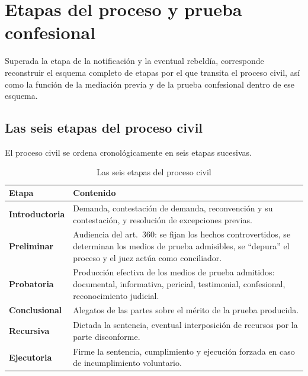 \documentclass[12pt,oneside]{book}
\begin{document}
\chapter[Etapas del proceso y prueba confesional]{Etapas del proceso y prueba confesional}
\label{ch:etapas}

Superada la etapa de la notificación y la eventual rebeldía, corresponde reconstruir el esquema completo de etapas por el que transita el proceso civil, así como la función de la mediación previa y de la prueba confesional dentro de ese esquema.

\section{Las seis etapas del proceso civil}

El proceso civil se ordena cronológicamente en seis etapas sucesivas.

\begin{table}[H]
\centering
\begin{tabularx}{\textwidth}{
    >{\raggedright\arraybackslash}p{}
    >{\raggedright\arraybackslash}X
}
\toprule
\textbf{Etapa} & \textbf{Contenido} \\
\midrule
\textbf{Introductoria} & Demanda, contestación de demanda, reconvención y su contestación, y resolución de excepciones previas. \\
\textbf{Preliminar} & Audiencia del art.\ 360: se fijan los hechos controvertidos, se determinan los medios de prueba admisibles, se ``depura'' el proceso y el juez actúa como conciliador. \\
\textbf{Probatoria} & Producción efectiva de los medios de prueba admitidos: documental, informativa, pericial, testimonial, confesional, reconocimiento judicial. \\
\textbf{Conclusional} & Alegatos de las partes sobre el mérito de la prueba producida. \\
\textbf{Recursiva} & Dictada la sentencia, eventual interposición de recursos por la parte disconforme. \\
\textbf{Ejecutoria} & Firme la sentencia, cumplimiento y ejecución forzada en caso de incumplimiento voluntario. \\
\bottomrule
\end{tabularx}
\caption{Las seis etapas del proceso civil}
\end{table}
\end{document}
